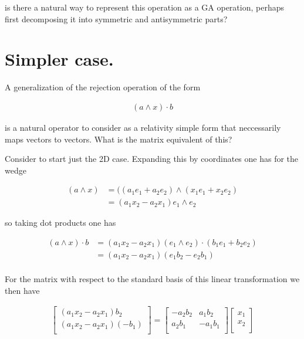 \documentclass{article}
\begin{document}
is there a natural way to represent this operation as a GA operation, perhaps first decomposing it into symmetric and antisymmetric parts?

\section{ Simpler case. }

A generalization of the rejection operation of the form

\begin{align*}
(a \wedge x ) \cdot b
\end{align*}

is a natural operator to consider as a relativity simple form that neccessarily maps vectors to vectors.  What is the matrix equivalent of this?

Consider to start just the 2D case.  Expanding this by coordinates one has for the wedge

\begin{align*}
(a \wedge x)
&= ((a_1 e_1 + a_2 e_2) \wedge (x_1 e_1 + x_2 e_2) \\
&= (a_1 x_2 - a_2 x_1) e_1 \wedge e_2
\end{align*}

so taking dot products one has

\begin{align*}
(a \wedge x ) \cdot b
&= (a_1 x_2 - a_2 x_1) (e_1 \wedge e_2) \cdot (b_1 e_1 + b_2 e_2) \\
&= (a_1 x_2 - a_2 x_1) (e_1 b_2 - e_2 b_1) \\
\end{align*}

For the matrix with respect to the standard basis of this linear transformation we then have

\begin{align*}
\begin{bmatrix}
(a_1 x_2 - a_2 x_1) b_2 \\
(a_1 x_2 - a_2 x_1) (-b_1) \\
\end{bmatrix}
=
\begin{bmatrix}
- a_2 b_2 & a_1 b_2  \\
a_2 b_1 & -a_1 b_1 \\
\end{bmatrix}
\begin{bmatrix}
x_1 \\
x_2 \\
\end{bmatrix}
\end{align*}
\end{document}
